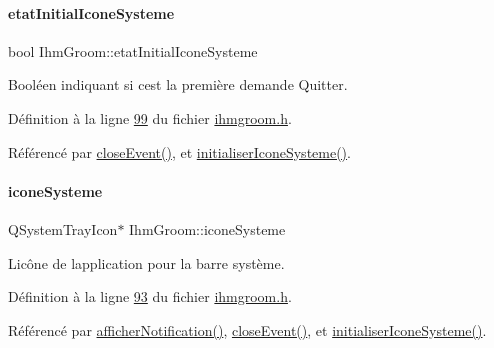 \paragraph{\texorpdfstring{etat\+Initial\+Icone\+Systeme}{etatInitialIconeSysteme}}
{\footnotesize\ttfamily bool Ihm\+Groom\+::etat\+Initial\+Icone\+Systeme\hspace{0.3cm}{\ttfamily [private]}}



Booléen indiquant si c\textquotesingle{}est la première demande Quitter. 



Définition à la ligne \hyperlink{ihmgroom_8h_source_l00099}{99} du fichier \hyperlink{ihmgroom_8h_source}{ihmgroom.\+h}.



Référencé par \hyperlink{ihmgroom_8cpp_source_l00087}{close\+Event()}, et \hyperlink{ihmgroom_8cpp_source_l00106}{initialiser\+Icone\+Systeme()}.

\mbox{\label{class_ihm_groom_a9ca0929cf284a9a2e3e2bc3489249919}} 
\paragraph{\texorpdfstring{icone\+Systeme}{iconeSysteme}}
{\footnotesize\ttfamily Q\+System\+Tray\+Icon$\ast$ Ihm\+Groom\+::icone\+Systeme\hspace{0.3cm}{\ttfamily [private]}}



L\textquotesingle{}icône de l\textquotesingle{}application pour la barre système. 



Définition à la ligne \hyperlink{ihmgroom_8h_source_l00093}{93} du fichier \hyperlink{ihmgroom_8h_source}{ihmgroom.\+h}.



Référencé par \hyperlink{ihmgroom_8cpp_source_l00151}{afficher\+Notification()}, \hyperlink{ihmgroom_8cpp_source_l00087}{close\+Event()}, et \hyperlink{ihmgroom_8cpp_source_l00106}{initialiser\+Icone\+Systeme()}.

\mbox{\label{class_ihm_groom_ab3f9d16d3e20234a71b1580d70ee4959}} 
